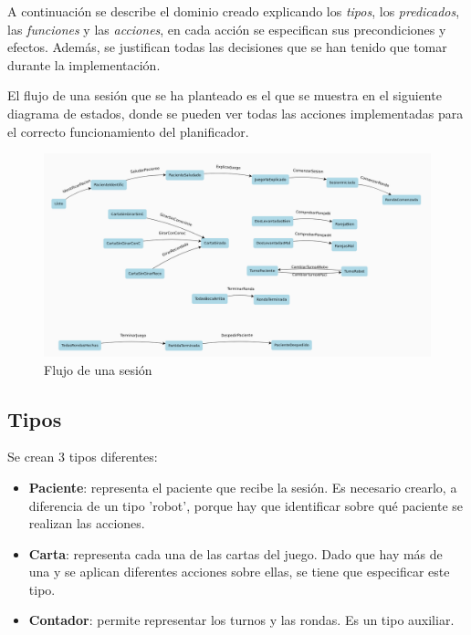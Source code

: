 \documentclass{uc3mpracticas}
\begin{document}
  A continuación se describe el dominio creado explicando los \textit{tipos}, los \textit{predicados}, las \textit{funciones} y las \textit{acciones}, en cada acción se especifican sus precondiciones y efectos. Además, se justifican todas las decisiones que se han tenido que tomar durante la implementación.

  \vspace{2mm}

  El flujo de una sesión que se ha planteado es el que se muestra en el siguiente diagrama de estados, donde se pueden ver todas las acciones implementadas para el correcto funcionamiento del planificador.


  \begin{figure}[!h]
    \centering
    \hspace*{-0.75cm}
    \includegraphics[width=1.1\linewidth]{./Images/flujo.png}
    \caption*{Flujo de una sesión}
  \end{figure}


  \newpage

  \subsection{Tipos}

  Se crean 3 tipos diferentes:

  \begin{itemize}
    \item \textbf{Paciente}: representa el paciente que recibe la sesión. Es necesario crearlo, a diferencia de un tipo 'robot', porque hay que identificar sobre qué paciente se realizan las acciones.
    \item \textbf{Carta}: representa cada una de las cartas del juego. Dado que hay más de una y se aplican diferentes acciones sobre ellas, se tiene que especificar este tipo.
    \item \textbf{Contador}: permite representar los turnos y las rondas. Es un tipo auxiliar.
  \end{itemize}
\end{document}
